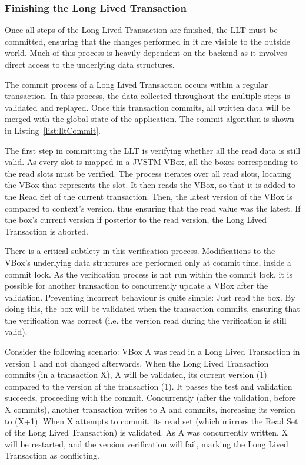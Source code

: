 \documentclass{llncs}
\begin{document}
\subsubsection{Finishing the Long Lived Transaction}
\label{sec:jvstm-commit}

Once all steps of the Long Lived Transaction are finished, the LLT
must be committed, ensuring that the changes performed in it are
visible to the outside world. Much of this process is heavily
dependent on the backend as it involves direct access to the
underlying data structures.

The commit process of a Long Lived Transaction occurs within a regular
transaction. In this process, the data collected throughout the
multiple steps is validated and replayed. Once this transaction
commits, all written data will be merged with the global state of the
application. The commit algorithm is shown in Listing~\ref{list:lltCommit}.

The first step in committing the LLT is verifying whether all the read
data is still valid. As every slot is mapped in a JVSTM VBox, all the
boxes corresponding to the read slots must be verified. The process
iterates over all read slots, locating the VBox that represents the
slot. It then reads the VBox, so that it is added to the Read Set of
the current transaction. Then, the latest version of the VBox is
compared to context's version, thus ensuring that the read value was
the latest. If the box's current version if posterior to the read
version, the Long Lived Transaction is aborted.

There is a critical subtlety in this verification
process. Modifications to the VBox's underlying data structures are
performed only at commit time, inside a commit lock. As the
verification process is not run within the commit lock, it is possible
for another transaction to concurrently update a VBox after the
validation. Preventing incorrect behaviour is quite simple: Just read
the box. By doing this, the box will be validated when the transaction
commits, ensuring that the verification was correct (i.e. the version
read during the verification is still valid).

Consider the following scenario: VBox A was read in a Long Lived
Transaction in version 1 and not changed afterwards. When the Long
Lived Transaction commits (in a transaction X), A will be validated,
its current version (1) compared to the version of the transaction
(1). It passes the test and validation succeeds, proceeding with the
commit. Concurrently (after the validation, before X commits), another
transaction writes to A and commits, increasing its version to (X+1). When
X attempts to commit, its read set (which mirrors the Read Set of the
Long Lived Transaction) is validated. As A was concurrently written, X
will be restarted, and the version verification will fail, marking the
Long Lived Transaction as conflicting.
\end{document}
